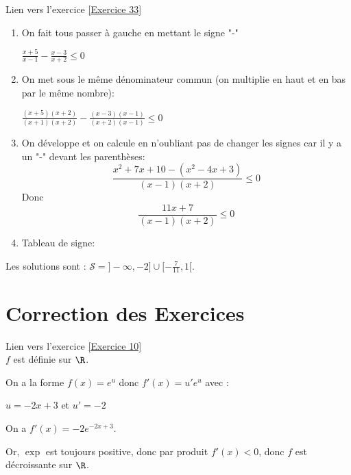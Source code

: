 \documentclass[12pt,fleqn]{report} %
\begin{document}
\begin{correction}Lien vers l'exercice   \ref{Exercice 33}
	\begin{enumerate}
		\item On fait tous passer à gauche en mettant le signe "-"\\[2mm]
		\begin{center}
			$\frac{x+5}{x-1}-\frac{x-3}{x+2}\leq 0$\\[2 mm]
		\end{center}
		\item On met sous le même dénominateur commun (on multiplie en haut et en bas par le même nombre):\\[2 mm]
		\begin{center}
			$ \frac{(x+5)(x+2)}{(x+1)(x+2)}-\frac{(x-3)(x-1)}{(x+2)(x-1)}\leq 0$\\[2 mm]
		\end{center}
		\item On développe et on calcule en n'oubliant pas de changer les signes car il y a un "-" devant les parenthèses:\\[2 mm]
		
		\[
		\frac{x^2+7x+10-(x^2-4x+3)}{(x-1)(x+2)}\leq 0 
		\]
		Donc 
		\[\frac{11x+7}{(x-1)(x+2)}\leq 0\]
		\item Tableau de signe:
	\end{enumerate}
	Les solutions sont : $\mathcal{S} = ]-\infty,-2] \cup [-\frac{7}{11},1[$.
\end{correction}

\chapter{Correction des Exercices}
\begin{correction}Lien vers l'exercice   \ref{Exercice 10}\\
	$f$ est définie sur $\R$.
	
	On a la forme $f(x)=e^u$ donc $f'(x)=u'e^u$ avec : 
	\begin{center}
		$u=-2x+3$ et $u'=-2$
	\end{center}
	On a $f'(x)=-2e^{-2x+3}$.
	
	Or, $\exp$ est toujours positive, donc par produit $f'(x)<0$, donc $f$ est décroissante sur $\R$.
\end{correction}
\end{document}
